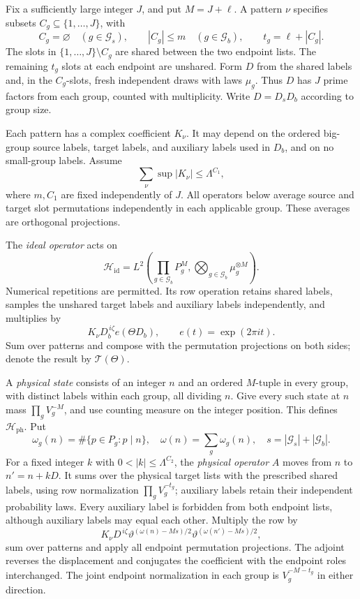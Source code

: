 Fix a sufficiently large integer \(J\), and put \(M=J+\ell\).
A pattern \(\nu\) specifies subsets
\(C_g\subseteq\{1,\ldots,J\}\), with
\[
 C_g=\varnothing\quad(g\in\mathcal G_s),\qquad
 |C_g|\le m\quad(g\in\mathcal G_b),\qquad t_g=\ell+|C_g|.
\]
The slots in \(\{1,\ldots,J\}\setminus C_g\) are shared between the
two endpoint lists. The remaining \(t_g\) slots at each endpoint
are unshared. Form \(D\) from the shared labels and, in the
\(C_g\)-slots, fresh independent draws with laws \(\mu_g\).
Thus \(D\) has \(J\) prime factors from each group, counted with
multiplicity. Write \(D=D_sD_b\) according to group size.

Each pattern has a complex coefficient \(K_\nu\). It may depend on
the ordered big-group source labels, target labels, and auxiliary
labels used in \(D_b\), and on no small-group labels. Assume
\begin{equation}
                 \sum_\nu\sup |K_\nu|\le\Lambda^{C_1},           \label{eq:inputmass}
\end{equation}
where \(m,C_1\) are fixed independently of \(J\). All operators below
average source and target slot permutations independently in each
applicable group. These averages are orthogonal projections.

The \emph{ideal operator} acts on
\[
 \mathcal H_{\mathrm{id}}=
 L^2\!\left(\prod_{g\in\mathcal G_b}P_g^M,
                    \bigotimes_{g\in\mathcal G_b}\mu_g^{\otimes M}\right).
\]
Numerical repetitions are permitted. Its row operation retains shared
labels, samples the unshared target labels and auxiliary labels
independently, and multiplies by
\[
                         K_\nu D_b^{\,i\zeta}e(\Theta D_b),
             \qquad e(t)=\exp(2\pi it).
\]
Sum over patterns and compose with the permutation projections on
both sides; denote the result by \(\mathcal T(\Theta)\).

A \emph{physical state} consists of an integer \(n\) and an ordered
\(M\)-tuple in every group, with distinct labels within each group,
all dividing \(n\). Give every such state at \(n\) mass
\(\prod_gV_g^{-M}\), and use counting measure on the integer position.
This defines \(\mathcal H_{\mathrm{ph}}\). Put
\[
 \omega_g(n)=\#\{p\in P_g:p\mid n\},\quad
 \omega(n)=\sum_g\omega_g(n),\quad
 s=|\mathcal G_s|+|\mathcal G_b|.
\]
For a fixed integer \(k\) with \(0<|k|\le\Lambda^{C_2}\), the
\emph{physical operator} \(A\) moves from \(n\) to \(n'=n+kD\).
It sums over the physical target lists with the prescribed shared
labels, using row normalization \(\prod_gV_g^{-t_g}\); auxiliary
labels retain their independent probability laws. Every auxiliary
label is forbidden from both endpoint lists, although auxiliary
labels may equal each other. Multiply the row by
\begin{equation}
 K_\nu D^{\,i\zeta}
       \vartheta^{(\omega(n)-Ms)/2}
       \vartheta^{(\omega(n')-Ms)/2},                            \label{eq:inputphysical}
\end{equation}
sum over patterns and apply all endpoint permutation projections.
The adjoint reverses the displacement and conjugates the coefficient
with the endpoint roles interchanged. The joint endpoint
normalization in each group is \(V_g^{-M-t_g}\) in either direction.

